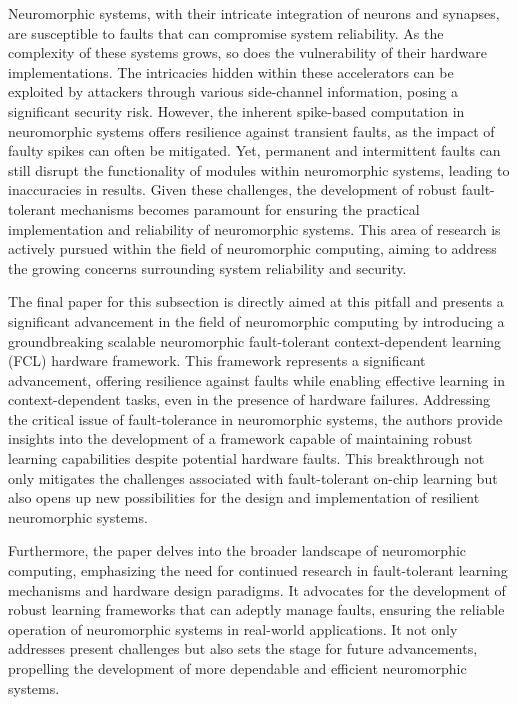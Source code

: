 \documentclass[screen, acmtog]{acmart}
\begin{document}
Neuromorphic systems, with their intricate integration of neurons and synapses, are susceptible to faults that can compromise system reliability. As the complexity of these systems grows, so does the vulnerability of their hardware implementations. The intricacies hidden within these accelerators can be exploited by attackers through various side-channel information, posing a significant security risk. However, the inherent spike-based computation in neuromorphic systems offers resilience against transient faults, as the impact of faulty spikes can often be mitigated. Yet, permanent and intermittent faults can still disrupt the functionality of modules within neuromorphic systems, leading to inaccuracies in results. Given these challenges, the development of robust fault-tolerant mechanisms becomes paramount for ensuring the practical implementation and reliability of neuromorphic systems. This area of research is actively pursued within the field of neuromorphic computing, aiming to address the growing concerns surrounding system reliability and security.

The final paper for this subsection is directly aimed at this pitfall and presents a significant advancement in the field of neuromorphic computing by introducing a groundbreaking scalable neuromorphic fault-tolerant context-dependent learning (FCL) hardware framework\cite{FaultTolerant}. This framework represents a significant advancement, offering resilience against faults while enabling effective learning in context-dependent tasks, even in the presence of hardware failures. Addressing the critical issue of fault-tolerance in neuromorphic systems, the authors provide insights into the development of a framework capable of maintaining robust learning capabilities despite potential hardware faults. This breakthrough not only mitigates the challenges associated with fault-tolerant on-chip learning but also opens up new possibilities for the design and implementation of resilient neuromorphic systems.

Furthermore, the paper delves into the broader landscape of neuromorphic computing, emphasizing the need for continued research in fault-tolerant learning mechanisms and hardware design paradigms. It advocates for the development of robust learning frameworks that can adeptly manage faults, ensuring the reliable operation of neuromorphic systems in real-world applications. It not only addresses present challenges but also sets the stage for future advancements, propelling the development of more dependable and efficient neuromorphic systems.
\end{document}
